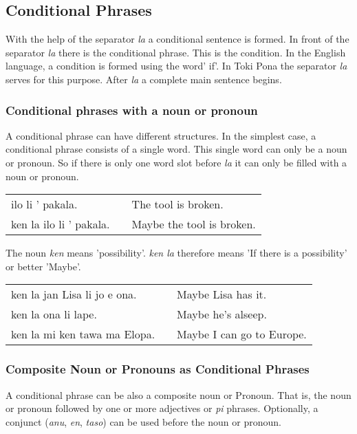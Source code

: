 %
\newpage
%
\subsection*{Conditional Phrases}
%
%
With the help of the separator \textit{la} a conditional sentence is formed.
In front of the separator \textit{la} there is the conditional phrase. 
This is the condition. 
In the English language, a condition is formed using the word' if'.
In Toki Pona the separator \textit{la} serves for this purpose. 
After \textit{la} a complete main sentence begins.

%
\subsubsection*{Conditional phrases with a noun or pronoun}
%
%
A conditional phrase can have different structures. 
In the simplest case, a conditional phrase consists of a single word. 
This single word can only be a noun or pronoun. 
So if there is only one word slot before \textit{la} it can only be filled with a noun or pronoun. 

\begin{supertabular}{p{5,5cm}|ll}
ilo li ' pakala. && The tool is broken. \\
ken la ilo li ' pakala. && Maybe the tool is broken. \\
\end{supertabular} 

The noun \textit{ken} means 'possibility'.
\textit{ken la} therefore means 'If there is a possibility' or better 'Maybe'.
 
\begin{supertabular}{p{5,5cm}|ll}
ken la jan Lisa li jo e ona. && Maybe Lisa has it. \\
ken la ona li lape. && Maybe he's alseep. \\
ken la mi ken tawa ma Elopa. && Maybe I can go to Europe. \\
\end{supertabular} 

%
%
\subsubsection*{Composite Noun or Pronouns as Conditional Phrases}
%
%
A conditional phrase can be also a composite noun or Pronoun. 
That is, the noun or pronoun followed by one or more adjectives or \textit{pi} phrases.
Optionally, a conjunct (\textit{anu}, \textit{en}, \textit{taso}) can be used before the noun or pronoun. 


